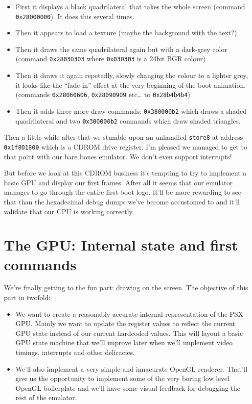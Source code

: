 \documentclass[a4paper]{article}
\newcommand{\code}[1] {\texttt{#1}}
\begin{document}
\begin{itemize}
\item First it displays a black quadrilateral that takes the whole screen
  (command \code{0x28000000}). It does this several times.
\item Then it appears to load a texture (maybe the background with the
  text?)
\item Then it draws the same quadrilateral again but with a dark-grey
  color (command \code{0x28030303} where \code{0x030303} is a 24bit
  BGR colour)
\item Then it draws it again repetedly, slowly changing the colour to a
  lighter grey, it looks like the ``fade-in'' effect at the very
  beginning of the boot animation. (commands \code{0x28060606},
  \code{0x28090909} etc\dots{} to \code{0x28b4b4b4})
\item Then it adds three more draw commands: \code{0x380000b2} which
  draws a shaded quadrilateral and two \code{0x300000b2} commands
  which draw shaded triangles.
\end{itemize}

Then a little while after that we stumble upon an unhandled
\code{store8} at address \code{0x1f801800} which is a CDROM drive
register. I'm pleased we managed to get to that point with our bare
bones emulator. We don't even support interrupts!

But before we look at this CDROM business it's tempting to try to
implement a basic GPU and display our first frames. After all it seems
that our emulator manages to go through the entire first boot
logo. It'll be more rewarding to see that than the hexadecimal debug
dumps we've become accustomed to and it'll validate that our CPU is
working correctly.

\section{The GPU: Internal state and first commands}

We're finally getting to the fun part: drawing on the screen. The
objective of this part in twofold:

\begin{itemize}
\item We want to create a reasonably accurate internal representation
  of the PSX GPU. Mainly we want to update the register values to
  reflect the current GPU state instead of our current hardcoded
  values. This will layout a basic GPU state machine that we'll
  improve later when we'll implement video timings, interrupts and
  other delicacies.

\item We'll also implement a very simple and innacurate OpenGL
  renderer. That'll give us the opportunity to implement some of the
  very boring low level OpenGL boilerplate and we'll have some visual
  feedback for debugging the rest of the emulator.
\end{itemize}
\end{document}

